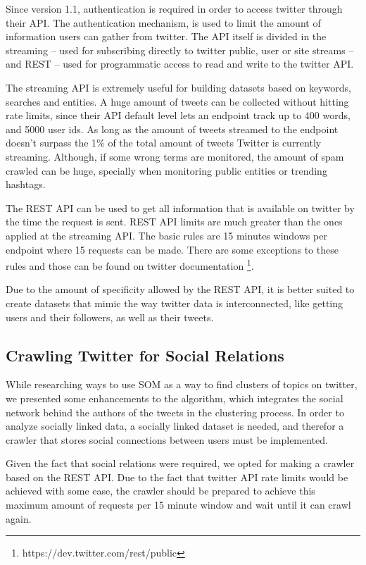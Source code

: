 Since version 1.1, authentication is required in order to access twitter through their API. The authentication mechanism, is used to limit the amount of information users can gather from twitter. 
The API itself is divided in the streaming -- used for subscribing directly to twitter public, user or site streams --  and REST -- used for programmatic access to read and write to the twitter API.  

The streaming API is extremely useful for building datasets based on keywords, searches and entities. A huge amount of tweets can be collected without hitting rate limits, since their API default level lets an endpoint track up to 400 words, and 5000 user ids. As long as the amount of tweets streamed to the endpoint doesn't  surpass the 1\% of the total amount of tweets Twitter is currently streaming. Although, if some wrong terms are monitored, the amount of spam crawled can be huge, specially when monitoring public entities or trending hashtags. 

The REST API can be used to get all information that is available on twitter by the time the request is sent. REST API limits are much greater than the ones applied at the streaming API. The basic rules are 15 minutes windows per endpoint where 15 requests can be made. There are some exceptions to these rules and those can be found on twitter documentation \footnote{https://dev.twitter.com/rest/public}.


Due to the amount of specificity allowed by the REST API, it is better suited to create datasets that mimic the way twitter data is interconnected, like getting users and their followers, as well as their tweets.

\subsection{Crawling Twitter for Social Relations}
\label{sub:crawling_twitter_for_social_relations}
While researching ways to use \ac{SOM} as a way to find clusters of topics on twitter, we presented some enhancements to the algorithm, which integrates the social network behind the authors of the tweets in the clustering process. In order to analyze socially linked data, a socially linked dataset is needed, and therefor a crawler that stores social connections between users must be implemented.   

Given the fact that social relations were required, we opted for making a crawler based on the REST API. Due to the fact that twitter API rate limits would be achieved with some ease, the crawler should be prepared to achieve this maximum amount of requests per 15 minute window and wait until it can crawl again. 

